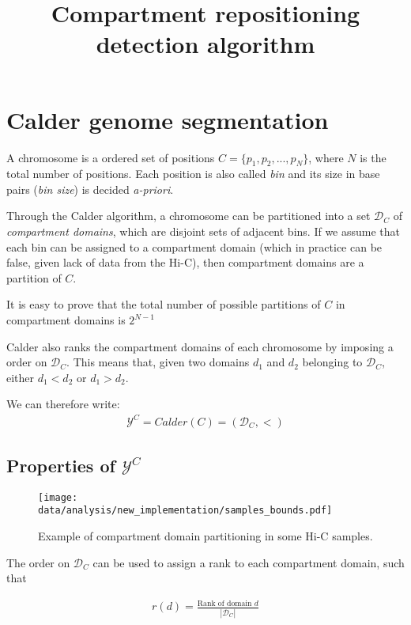 \documentclass{article}
\title{Compartment repositioning detection algorithm}
\author{}
\begin{document}
\maketitle

\section{Calder genome segmentation}
A chromosome is a ordered set of positions $C = \{p_1,p_2,...,p_N\}$, where $N$ is the total number of positions. Each position is also called \textit{bin} and its size in base pairs (\textit{bin size}) is decided \textit{a-priori}.


Through the Calder algorithm, a chromosome can be partitioned into a set $\mathcal{D}_C$ of \textit{compartment domains}, which are disjoint sets of adjacent bins. If we assume that each bin can be assigned to a compartment domain (which in practice can be false, given lack of data from the Hi-C), then compartment domains are a partition of $C$.

It is easy to prove that the total number of possible partitions of $C$ in compartment domains is $2^{N - 1}$

Calder also ranks the compartment domains of each chromosome by imposing a order on $\mathcal{D}_C$. This means that, given two domains $d_1$ and $d_2$ belonging to $\mathcal{D}_C$, either $d_1 < d_2$ or $d_1 > d_2$.

We can therefore write:
\begin{align*}
	\mathcal{Y}^C = Calder(C) = \left( \mathcal{D}_C, < \right)
\end{align*}

\subsection{Properties of $\mathcal{Y}^C$}

\begin{figure}[tb]
	\centering
	\texttt{[image: data/analysis/new\_implementation/samples\_bounds.pdf]}
	\caption{Example of compartment domain partitioning in some Hi-C samples.}
	\label{fig:partitioning}
\end{figure}


The order on $\mathcal{D}_C$ can be used to assign a rank to each compartment domain, such that

\begin{align*}
	r(d) = \frac{\text{Rank of domain } d}{|\mathcal{D}_C|}
\end{align*}
\end{document}
